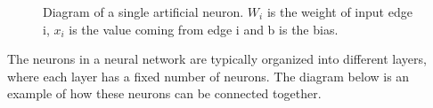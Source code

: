 \begin{figure}[H]
  \centering
    \caption{Diagram of a single artificial neuron. $W_{i}$ is the weight of input edge i, $x_{i}$ is the value coming from edge i and b is the bias.} %
    \label{fig:single_neuron}

\end{figure}

The neurons in a neural network are typically organized into different layers, where each layer has a fixed number of neurons. The diagram below is an example of how these neurons can be connected together.

